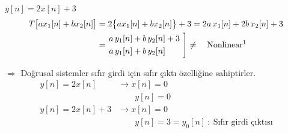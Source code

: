 \documentclass[11pt,a4paper]{article}
\begin{document}
\begin{ornek}[(Ex)]
$y[n] = 2x[n] + 3$ \hfill {}
\[ \begin{aligned}
  T\bigl[a x_1[n] + b x_2[n]\bigr] &= 2\bigl\{a x_1[n] + b x_2[n]\bigr\} + 3 = 2a\,x_1[n] + 2b\,x_2[n] + 3 \\
  &= \left.\begin{aligned} &a\,y_1[n] + b\,y_2[n] + 3 \\ &a\,y_1[n] + b\,y_2[n] \end{aligned}\ \right]\neq \quad \text{Nonlinear\footnotemark}
\end{aligned} \]
\end{ornek}

$\Rightarrow$ Doğrusal sistemler sıfır girdi için sıfır çıktı özelliğine sahiptirler.
\begin{align*}
  y[n] = 2x[n] &\longrightarrow x[n] = 0 \\
  &\phantom{\longrightarrow}\ \ y[n] = 0 \\[1mm]
  y[n] = 2x[n] + 3 &\longrightarrow x[n] = 0 \\
  &\phantom{\longrightarrow}\ \ y[n] = 3 = y_0[n] \ : \ \text{Sıfır girdi çıktısı}
\end{align*}
\end{document}
